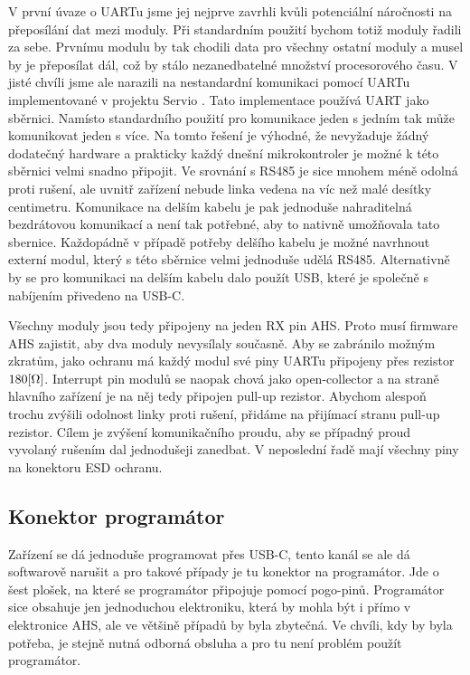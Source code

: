 V první úvaze o UARTu jsme jej nejprve zavrhli kvůli potenciální náročnosti na přeposílání dat mezi moduly.
Při standardním použití bychom totiž moduly řadili za sebe.
Prvnímu modulu by tak chodili data pro všechny ostatní moduly a musel by je přeposílat dál, což by stálo nezanedbatelné množství procesorového času.
V jisté chvíli jsme ale narazili na nestandardní komunikaci pomocí UARTu implementované v projektu Servio \cite{Servio}.
Tato implementace používá UART jako sběrnici.
Namísto standardního použití pro komunikace jeden s jedním tak může komunikovat jeden s více.
Na tomto řešení je výhodné, že nevyžaduje žádný dodatečný hardware a prakticky každý dnešní mikrokontroler je možné k této sběrnici velmi snadno připojit.
Ve srovnání s RS485 je sice mnohem méně odolná proti rušení, ale uvnitř zařízení nebude linka vedena na víc než malé desítky centimetru.
Komunikace na delším kabelu je pak jednoduše nahraditelná bezdrátovou komunikací a není tak potřebné, aby to nativně umožňovala tato sbernice.
Každopádně v případě potřeby delšího kabelu je možné navrhnout externí modul, který s této sběrnice velmi jednoduše udělá RS485.
Alternativně by se pro komunikaci na delším kabelu dalo použít USB, které je společně s nabíjením přivedeno na USB-C.

Všechny moduly jsou tedy připojeny na jeden RX pin AHS.
Proto musí firmware AHS zajistit, aby dva moduly nevysílaly současně.
Aby se zabránilo možným zkratům, jako ochranu má každý modul své piny UARTu připojeny přes rezistor \(180\-[\Omega]\).
Interrupt pin modulů se naopak chová jako open-collector a na straně hlavního zařízení je na něj tedy připojen pull-up rezistor.
Abychom alespoň trochu zvýšili odolnost linky proti rušení, přidáme na přijímací stranu pull-up rezistor.
Cílem je zvýšení komunikačního proudu, aby se případný proud vyvolaný rušením dal jednodušeji zanedbat.
V neposlední řadě mají všechny piny na konektoru ESD ochranu.

\subsection{Konektor programátor}
Zařízení se dá jednoduše programovat přes USB-C, tento kanál se ale dá softwarově narušit a pro takové případy je tu konektor na programátor.
Jde o šest plošek, na které se programátor připojuje pomocí pogo-pinů.
Programátor sice obsahuje jen jednoduchou elektroniku, která by mohla být i přímo v elektronice AHS, ale ve většině případů by byla zbytečná.
Ve chvíli, kdy by byla potřeba, je stejně nutná odborná obsluha a pro tu není problém použít programátor.

